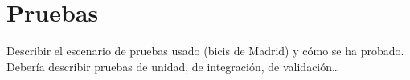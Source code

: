 \chapter{Pruebas}

Describir el escenario de pruebas usado (bicis de Madrid) y cómo se ha probado. Debería describir pruebas de unidad, de integración, de validación\dots
